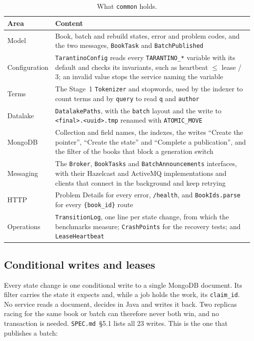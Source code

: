 \documentclass[11pt,a4paper]{article}
\newcommand{\code}[1]{\nolinkurl{#1}}
\newcommand{\spec}[1]{\code{SPEC.md}~\S#1}
\begin{document}
\begin{table}[ht]
\centering
\small
\caption{What \code{common} holds.}
\label{tab:common}
\begin{tabularx}{\textwidth}{@{}L{2.3cm}Y@{}}
\toprule
Area & Content \\
\midrule
Model & Book, batch and rebuild states, error and problem codes, and the two messages, \code{BookTask} and \code{BatchPublished} \\
Configuration & \code{TarantinoConfig} reads every \code{TARANTINO_*} variable with its default and checks its invariants, such as heartbeat $\leq$ lease / 3; an invalid value stops the service naming the variable \\
Terms & The Stage~1 \code{Tokenizer} and stopwords, used by the indexer to count terms and by \code{query} to read \code{q} and \code{author} \\
Datalake & \code{DatalakePaths}, with the \code{batch} layout and the write to \code{<final>.<uuid>.tmp} renamed with \code{ATOMIC_MOVE} \\
MongoDB & Collection and field names, the indexes, the writes ``Create the pointer'', ``Create the state'' and ``Complete a publication'', and the filter of the books that block a generation switch \\
Messaging & The \code{Broker}, \code{BookTasks} and \code{BatchAnnouncements} interfaces, with their Hazelcast and ActiveMQ implementations and clients that connect in the background and keep retrying \\
HTTP & Problem Details for every error, \code{/health}, and \code{BookIds.parse} for every \code{{book_id}} route \\
Operations & \code{TransitionLog}, one line per state change, from which the benchmarks measure; \code{CrashPoints} for the recovery tests; and \code{LeaseHeartbeat} \\
\bottomrule
\end{tabularx}
\end{table}

\subsection{Conditional writes and leases}
\label{sec:conditional-writes}

Every state change is one conditional write to a single MongoDB document. Its filter carries the state it expects and,
while a job holds the work, its \code{claim_id}. No service reads a document, decides in Java and writes it back. Two
replicas racing for the same book or batch can therefore never both win, and no transaction is needed.
\spec{5.1} lists all 23 writes. This is the one that publishes a batch:
\end{document}
